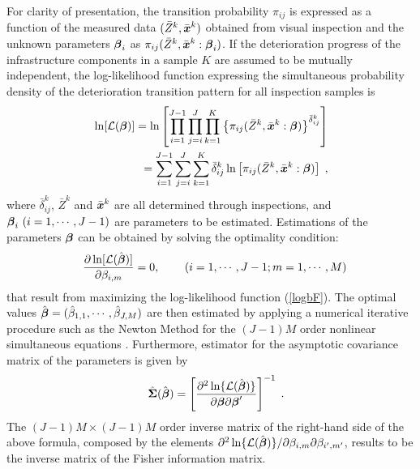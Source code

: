 For clarity of presentation, the transition probability $\pi_{ij}$ is expressed as a function of the measured data $(\bar{Z}^k,\bar{\mbox{\boldmath$x$}}^k)$ obtained from visual inspection and the unknown parameters $\mbox{\boldmath$\beta$}_i$ as $\pi_{ij}(\bar{Z}^k,\bar{\mbox{\boldmath$x$}}^k:\mbox{\boldmath$\beta$}_i)$. If the deterioration progress of the infrastructure components in a sample $K$ are assumed to be mutually independent, the log-likelihood function expressing the simultaneous probability density of the deterioration transition pattern for all inspection samples is \cite{tobin,amemi}
\begin{eqnarray}
&& \hspace{-3mm} \ln[{\cal L}(\mbox{\boldmath$\beta$})] = \ln \left[\prod_{i=1}^{J-1} \prod_{j=i}^J\prod_{k=1}^{K} \left\{\pi_{ij}(\bar{Z}^k,\bar{\mbox{\boldmath$x$}}^k:\mbox{\boldmath$\beta$})\right\}^{\bar{\delta}_{ij}^k}\right]
\nonumber \\
&& \hspace{5mm} =\sum_{i=1}^{J-1} \sum_{j=i}^J\sum_{k=1}^K \bar{\delta}_{ij}^k \ln\left[
\pi_{ij}(\bar{Z}^k,\bar{\mbox{\boldmath$x$}}^k:\mbox{\boldmath$\beta$})\right] \hspace{1mm},
 \label{logbF}
\end{eqnarray}
where $\bar{\delta}_{ij}^k$, $\bar{Z}^k$ and  $\bar{\mbox{\boldmath$x$}}^k$ are all determined through inspections, and $\mbox{\boldmath$\beta$}_i~(i=1,\cdots,J-1)$ are parameters to be estimated. Estimations of the parameters $\mbox{\boldmath$\beta$}$ can be obtained by solving the optimality condition:
\begin{eqnarray}
&& \frac{ \partial \ln[{\cal L}(\hat{\mbox{\boldmath$\beta$}})] }{\partial \beta_{i,m}}=0, \label{saiteki}
\hspace{3mm} \quad ~(i=1,\cdots,J-1;m=1,\cdots,M) \hspace{1mm}
\end{eqnarray}
that result from maximizing the log-likelihood function (\ref{logbF}). The optimal values $\hat{\mbox{\boldmath$\beta$}}=(\hat{\beta}_{1,1},\cdots,\hat{\beta}_{J,M})$ are then estimated by applying a numerical iterative procedure such as the Newton Method for the $(J-1)M$ order nonlinear simultaneous equations \cite{isoda}. Furthermore, estimator for the asymptotic covariance matrix of the parameters is given by
\begin{eqnarray}
&& \hat{\mbox{\boldmath$\Sigma$}}( \hat{\mbox{\boldmath$\beta$}})
= \left[ \frac{ \partial^2\ln\{ {\cal L}( \hat{\mbox{\boldmath$\beta$}})\} }{\partial \mbox{\boldmath$\beta$} \partial \mbox{\boldmath$\beta$}'}  \right]^{-1}\hspace{1mm}.
\end{eqnarray}
The $(J-1)M\times (J-1)M$ order inverse matrix of the right-hand side of the above formula, composed by the elements $\partial^2\ln\{{\cal L}( \hat{\mbox{\boldmath$\beta$}})\}/\partial \beta_{i,m} \partial \beta_{i^\prime, m^\prime}$, results to be the inverse matrix of the Fisher information matrix.

